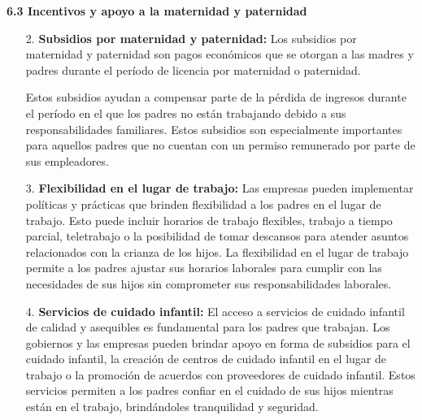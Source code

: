 \documentclass[8pt,a4paper]{beamer}
\begin{document}
{\begin{frame}{}
\begin{block}{\textbf{6.3 Incentivos y apoyo a la maternidad y paternidad}}
\begin{enumerate}
\item[2.] \textbf{Subsidios por maternidad y paternidad:} Los subsidios por maternidad y paternidad son pagos económicos que se otorgan a las madres y padres durante el período de licencia por maternidad o paternidad. 
\end{enumerate}
\end{block}
\end{frame}

\begin{frame}{}
\begin{block}{}
\setlength{\parskip}{3px}
\justifying
\begin{enumerate}
\setlength{\parskip}{3px}
\justifying
\item[{}] Estos subsidios ayudan a compensar parte de la pérdida de ingresos durante el período en el que los padres no están trabajando debido a sus responsabilidades familiares. Estos subsidios son especialmente importantes para aquellos padres que no cuentan con un permiso remunerado por parte de sus empleadores.

\item[3.] \textbf{Flexibilidad en el lugar de trabajo:} Las empresas pueden implementar políticas y prácticas que brinden flexibilidad a los padres en el lugar de trabajo. Esto puede incluir horarios de trabajo flexibles, trabajo a tiempo parcial, teletrabajo o la posibilidad de tomar descansos para atender asuntos relacionados con la crianza de los hijos. La flexibilidad en el lugar de trabajo permite a los padres ajustar sus horarios laborales para cumplir con las necesidades de sus hijos sin comprometer sus responsabilidades laborales.

\item[4.] \textbf{Servicios de cuidado infantil:} El acceso a servicios de cuidado infantil de calidad y asequibles es fundamental para los padres que trabajan. Los gobiernos y las empresas pueden brindar apoyo en forma de subsidios para el cuidado infantil, la creación de centros de cuidado infantil en el lugar de trabajo o la promoción de acuerdos con proveedores de cuidado infantil. Estos servicios permiten a los padres confiar en el cuidado de sus hijos mientras están en el trabajo, brindándoles tranquilidad y seguridad.

\end{enumerate}

\end{block}
\end{frame}

}
\end{document}

